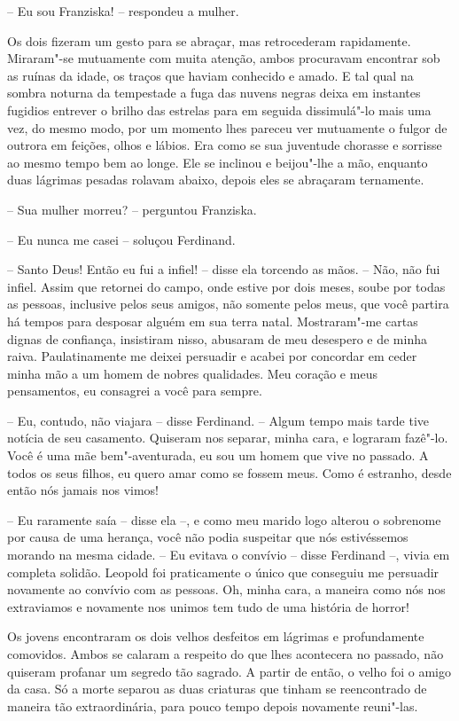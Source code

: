 -- Eu sou Franziska! -- respondeu a mulher.

Os dois fizeram um gesto para se abraçar, mas retrocederam rapidamente.
Miraram"-se mutuamente com muita atenção, ambos procuravam encontrar sob
as ruínas da idade, os traços que haviam conhecido e amado. E tal qual
na sombra noturna da tempestade a fuga das nuvens negras deixa em
instantes fugidios entrever o brilho das estrelas para em seguida
dissimulá"-lo mais uma vez, do mesmo modo, por um momento lhes pareceu
ver mutuamente o fulgor de outrora em feições, olhos e lábios. Era como
se sua juventude chorasse e sorrisse ao mesmo tempo bem ao longe. Ele
se inclinou e beijou"-lhe a mão, enquanto duas lágrimas pesadas rolavam
abaixo, depois eles se abraçaram ternamente. 

-- Sua mulher morreu? -- perguntou Franziska.

-- Eu nunca me casei -- soluçou Ferdinand. 

-- Santo Deus! Então eu fui a infiel! -- disse ela torcendo as mãos.
 -- Não, não fui infiel. Assim que retornei do campo, onde estive por dois
meses, soube por todas as pessoas, inclusive pelos seus amigos, não
somente pelos meus, que você partira há tempos para desposar alguém em
sua terra natal. Mostraram"-me cartas dignas de confiança, insistiram
nisso, abusaram de meu desespero e de minha raiva. Paulatinamente me
deixei persuadir e acabei por concordar em ceder minha mão a um homem
de nobres qualidades. Meu coração e meus pensamentos, eu consagrei a
você para sempre.

 -- Eu, contudo, não viajara -- disse Ferdinand. -- Algum tempo mais
tarde tive notícia de seu casamento. Quiseram nos separar, minha cara,
e lograram fazê"-lo. Você é uma mãe bem"-aventurada, eu sou um homem que
vive no passado. A todos os seus filhos, eu quero amar como se fossem
meus. Como é estranho, desde então nós jamais nos vimos!
 
-- Eu raramente saía -- disse ela --, e como meu marido logo alterou o
sobrenome por causa de uma herança, você não podia suspeitar que nós
estivéssemos morando na mesma cidade.
\pagebreak
-- Eu evitava o convívio -- disse Ferdinand --, vivia em completa
solidão. Leopold foi praticamente o único que conseguiu me persuadir
novamente ao convívio com as pessoas. Oh, minha cara, a maneira como nós
nos extraviamos e novamente nos unimos tem tudo de uma história de horror!

Os jovens encontraram os dois velhos desfeitos em lágrimas e
profundamente comovidos. Ambos se calaram a respeito do que lhes
acontecera no passado, não quiseram profanar um segredo tão sagrado. A
partir de então, o velho foi o amigo da casa. Só a morte separou as
duas criaturas que tinham se reencontrado de maneira tão
extraordinária, para pouco tempo depois novamente reuni"-las.
\medskip

